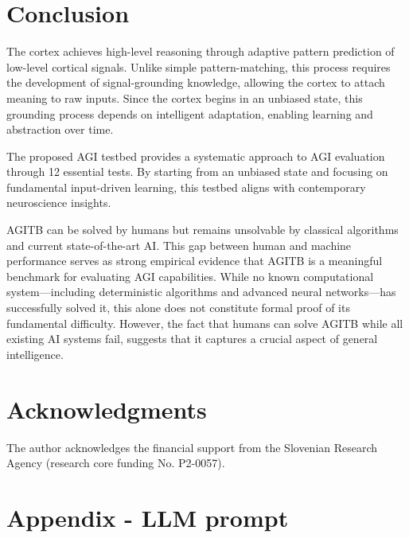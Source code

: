 \documentclass{article}
\begin{document}
\section{Conclusion}
The cortex achieves high-level reasoning through adaptive pattern prediction of low-level cortical signals. Unlike simple pattern-matching, this process requires the development of signal-grounding knowledge, allowing the cortex to attach meaning to raw inputs. Since the cortex begins in an unbiased state, this grounding process depends on intelligent adaptation, enabling learning and abstraction over time.

The proposed AGI testbed provides a systematic approach to AGI evaluation through 12 essential tests. By starting from an unbiased state and focusing on fundamental input-driven learning, this testbed aligns with contemporary neuroscience insights.

AGITB can be solved by humans but remains unsolvable by classical algorithms and current state-of-the-art AI. This gap between human and machine performance serves as strong empirical evidence that AGITB is a meaningful benchmark for evaluating AGI capabilities. While no known computational system—including deterministic algorithms and advanced neural networks—has successfully solved it, this alone does not constitute formal proof of its fundamental difficulty. However, the fact that humans can solve AGITB while all existing AI systems fail, suggests that it captures a crucial aspect of general intelligence.

\section*{Acknowledgments}
The author acknowledges the financial support from the Slovenian Research Agency (research core funding No. P2-0057).

\newpage

\appendix
\section*{Appendix - LLM prompt}
\end{document}
